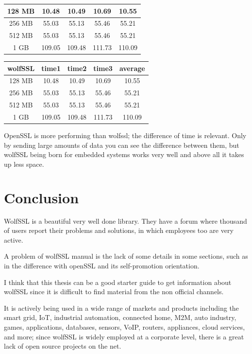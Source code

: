 \documentclass[a4paper,12pt]{article}
\begin{document}
\begin{tabular}{ ||c|c|c|c|c|| } 
 \hline
 128 MB & 10.48 & 10.49 & 10.69  & 10.55\\ 
 \hline
 256 MB & 55.03 & 55.13 & 55.46 & 55.21\\ 
 \hline
 512 MB & 55.03 & 55.13 & 55.46 & 55.21\\ 
 \hline
 1 GB & 109.05 & 109.48 & 111.73& 110.09 \\ 
 \hline
\end{tabular}
\newline
\newline

\begin{tabular}{ ||c|c|c|c|c|| } 
 \hline
 \textbf{wolfSSL} & time1 & time2 & time3 & average \\ 
 \hline
 128 MB & 10.48 & 10.49 & 10.69  & 10.55\\ 
 \hline
 256 MB & 55.03 & 55.13 & 55.46 & 55.21\\ 
 \hline
 512 MB & 55.03 & 55.13 & 55.46 & 55.21\\ 
 \hline
 1 GB & 109.05 & 109.48 & 111.73& 110.09 \\ 
 \hline
\end{tabular}
\newline

OpenSSL is more performing than wolfssl; the difference of time is relevant.
Only by sending large amounts of data you can see the difference between them, but wolfSSL being born for embedded systems works very well and above all it takes up less space.

\section{Conclusion}
WolfSSL is a beautiful very well done library. They have a forum where thousand of users report their problems and solutions, in which employees too are very active.

A problem of wolfSSL manual is the lack of some details in some sections, such as in the difference with openSSL and its self-promotion orientation.

I think that this thesis can be a good starter guide to get information about wolfSSL since it is difficult to find material from the non official channels.

It is actively being used in a wide range of markets and products including the smart grid, IoT, industrial automation, connected home, M2M, auto industry, games, applications, databases, sensors, VoIP, routers, appliances, cloud services, and more; since wolfSSL is widely employed at a corporate level, there is a great lack of open source projects on the net.
\end{document}
